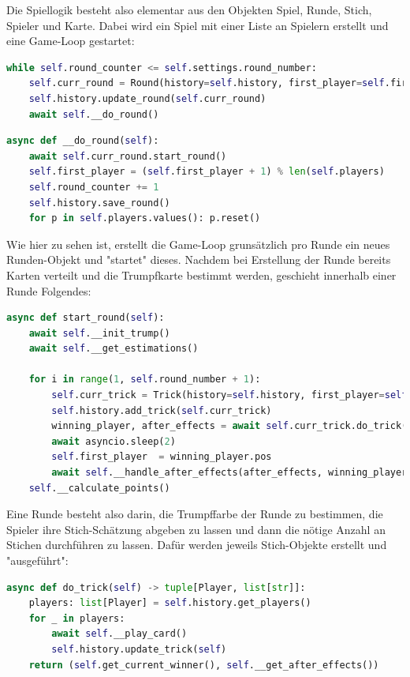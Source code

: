 Die Spiellogik besteht also elementar aus den Objekten Spiel, Runde, Stich, Spieler und Karte. Dabei wird ein Spiel mit einer Liste an Spielern erstellt und eine Game-Loop gestartet:

\begin{lstlisting}[language=Python]
while self.round_counter <= self.settings.round_number:
	self.curr_round = Round(history=self.history, first_player=self.first_player, round_counter=self.round_counter)
	self.history.update_round(self.curr_round)
	await self.__do_round()
\end{lstlisting}

\begin{lstlisting}[language=Python]
async def __do_round(self):
	await self.curr_round.start_round()
	self.first_player = (self.first_player + 1) % len(self.players)
	self.round_counter += 1
	self.history.save_round()
	for p in self.players.values(): p.reset()
\end{lstlisting}

Wie hier zu sehen ist, erstellt die Game-Loop grunsätzlich pro Runde ein neues Runden-Objekt und "startet" dieses. Nachdem bei Erstellung der Runde bereits Karten verteilt und die Trumpfkarte bestimmt werden, geschieht innerhalb einer Runde Folgendes:

\begin{lstlisting}[language=Python]
async def start_round(self):
	await self.__init_trump()
	await self.__get_estimations()
	
	for i in range(1, self.round_number + 1):
		self.curr_trick = Trick(history=self.history, first_player=self.first_player, trick_number=i, trump_color=self.trump_color)
		self.history.add_trick(self.curr_trick)
		winning_player, after_effects = await self.curr_trick.do_trick()
		await asyncio.sleep(2)
		self.first_player  = winning_player.pos
		await self.__handle_after_effects(after_effects, winning_player, i)
	self.__calculate_points()
\end{lstlisting}

Eine Runde besteht also darin, die Trumpffarbe der Runde zu bestimmen, die Spieler ihre Stich-Schätzung abgeben zu lassen und dann die nötige Anzahl an Stichen durchführen zu lassen. Dafür werden jeweils Stich-Objekte erstellt und "ausgeführt":

\begin{lstlisting}[language=Python]
async def do_trick(self) -> tuple[Player, list[str]]:
	players: list[Player] = self.history.get_players()
	for _ in players:
		await self.__play_card()
		self.history.update_trick(self)
	return (self.get_current_winner(), self.__get_after_effects())
\end{lstlisting}

